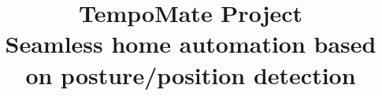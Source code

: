 \documentclass[11pt, conference]{IEEEtran}
\begin{document}
\newcommand{\addImageFull}[2]{
    \begin{figure}[ht]
        \begin{center}
            \texttt{[image: \#1]}
            \caption{#2} %
            \renewcommand{\thefigure}{\thesubsection.\arabic{figure}}
        \end{center}
    \end{figure}
}

\newcommand{\addImageSize}[3]{
    \begin{figure}[ht]
        \begin{center}
            \texttt{[image: \#2]}
            \caption{#3} %
            \renewcommand{\thefigure}{\thesubsection.\arabic{figure}}
        \end{center}
    \end{figure}
}

\setcounter{figure}{0}

\title{TempoMate Project\\
\small{Seamless home automation based on posture/position detection\\}
}

\makeatletter
\newcommand{\linebreakand}{
  \end{@IEEEauthorhalign}
  \hfill\mbox{}\par
  \mbox{}\hfill\begin{@IEEEauthorhalign}
}
\makeatother
\end{document}
